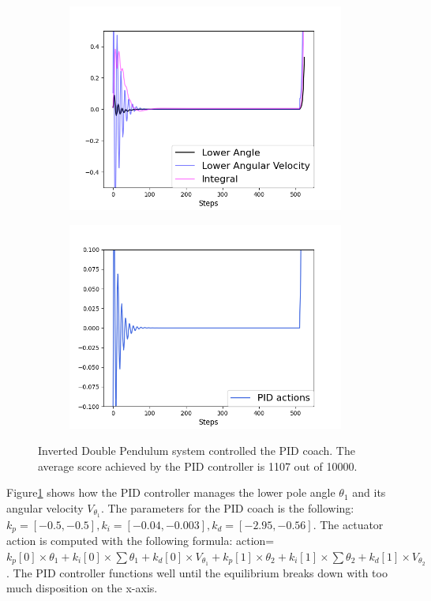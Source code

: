 \begin{figure}[H]
\centering
\begin{subfigure}{0.4\textwidth}
\centering
\includegraphics[width=\linewidth]{double_PID.png}
\end{subfigure}%
\begin{subfigure}{.4\textwidth}
\centering
\includegraphics[width=\linewidth]{double_PID_actions.png}
\end{subfigure}
\caption{Inverted Double Pendulum system controlled the PID coach. The average score achieved by the PID controller is 1107 out of 10000. }
\label{fig:double}
\end{figure}

Figure\ref{fig:double} shows how the PID controller manages the lower pole angle $\theta_1$ and its angular velocity $V_{\theta_1}$. The parameters for the PID coach is the following: $k_p=[-0.5,-0.5], k_i=[-0.04,-0.003], k_d=[-2.95,-0.56]$. The actuator action is computed with the following formula: action=$k_p[0]\times \theta_1+k_i[0]\times \sum{\theta_1}+k_d[0]\times V_{\theta_1}+k_p[1]\times \theta_2+k_i[1]\times \sum{\theta_2}+k_d[1]\times V_{\theta_2}$. The PID controller functions well until the equilibrium breaks down with too much disposition on the x-axis.

